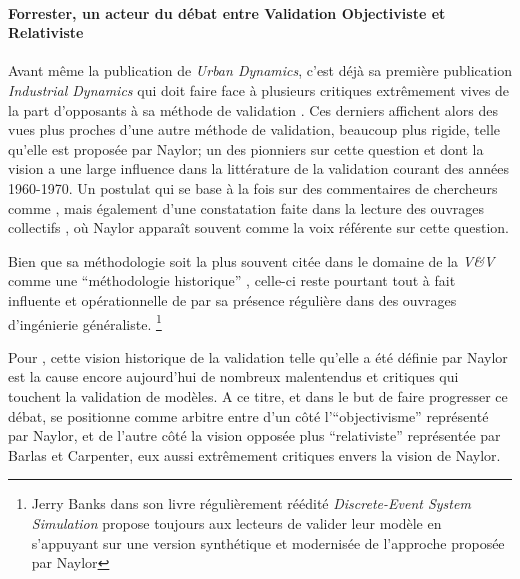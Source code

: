 
\paragraph{Forrester, un acteur du débat entre Validation Objectiviste et Relativiste}
\label{p:confrontation_approches}

Avant même la publication de \textit{Urban Dynamics}, c'est déjà sa première publication \textit{Industrial Dynamics} qui doit faire face à plusieurs critiques extrêmement vives de la part d'opposants à sa méthode de validation \autocite{Barlas1990}. Ces derniers affichent alors des vues plus proches d'une autre méthode de validation, beaucoup plus rigide, telle qu'elle est proposée par Naylor; un des pionniers sur cette question et dont la vision a une large influence dans la littérature de la validation courant des années 1960-1970. Un postulat qui se base à la fois sur des commentaires de chercheurs comme \autocite[1088]{Kleindorfer1998} \autocite{Nance2002}, mais également d'une constatation faite dans la lecture des ouvrages collectifs \autocite{Guetzkow1972}, où Naylor apparaît souvent comme la voix référente sur cette question.

Bien que sa méthodologie soit la plus souvent citée dans le domaine de la \textit{V\&V} comme une \enquote{méthodologie historique} \autocite{Sargent2010}, celle-ci reste pourtant tout à fait influente et opérationnelle de par sa présence régulière dans des ouvrages d'ingénierie généraliste. \footnote{Jerry Banks dans son livre régulièrement réédité \textit{Discrete-Event System Simulation} propose toujours aux lecteurs de valider leur modèle en s'appuyant sur une version synthétique et modernisée de l'approche proposée par Naylor}

Pour \textcite{Kleindorfer1998}, cette vision historique de la validation telle qu'elle a été définie par Naylor est la cause encore aujourd'hui de nombreux malentendus et critiques qui touchent la validation de modèles. A ce titre, et dans le but de faire progresser ce débat, \textcite{Kleindorfer1998} se positionne comme arbitre entre d'un côté l'\enquote{objectivisme} représenté par Naylor, et de l'autre côté la vision opposée plus \enquote{relativiste} représentée par Barlas et Carpenter, eux aussi extrêmement critiques envers la vision de Naylor.

